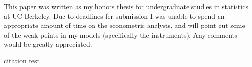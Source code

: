 \documentclass[12pt]{article}
\begin{document}
This paper was written as my honors thesis for undergraduate studies in statistics at UC Berkeley. Due to deadlines for submission I was unable to spend an appropriate amount of time on the econometric analysis, and will point out some of the weak points in my models (specifically the instruments). Any comments would be greatly appreciated.





\newpage
citation test \cite{lasso, latexcompanion, IV_orig}



\end{document}
